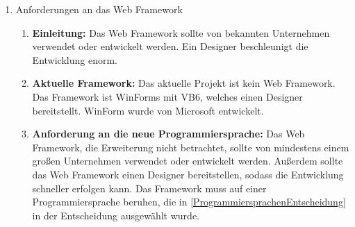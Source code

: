 \documentclass[ngerman]{article}
\begin{document}
\begin{enumerate}
\begin{enumerate}[label=]
        \end{enumerate}
        \item Anforderungen an das Web Framework
        \begin{enumerate}[label=]
            \item \textbf{Einleitung:} Das Web Framework sollte von bekannten Unternehmen verwendet oder entwickelt werden. Ein Designer beschleunigt die Entwicklung enorm.
            \item \textbf{Aktuelle Framework:} Das aktuelle Projekt ist kein Web Framework. Das Framework ist WinForms mit VB6, welches einen Designer bereitstellt. WinForm wurde von Microsoft entwickelt.
            \item \textbf{Anforderung an die neue Programmiersprache:} Das Web Framework, die Erweiterung nicht betrachtet, sollte von mindestens einem großen Unternehmen verwendet oder entwickelt werden. Außerdem sollte das Web Framework einen Designer bereitstellen, sodass die Entwicklung schneller erfolgen kann. Das Framework muss auf einer Programmiersprache beruhen, die in \ref{ProgrammiersprachenEntscheidung} in der Entscheidung ausgewählt wurde.
        \end{enumerate}
    \end{enumerate}
\end{document}
